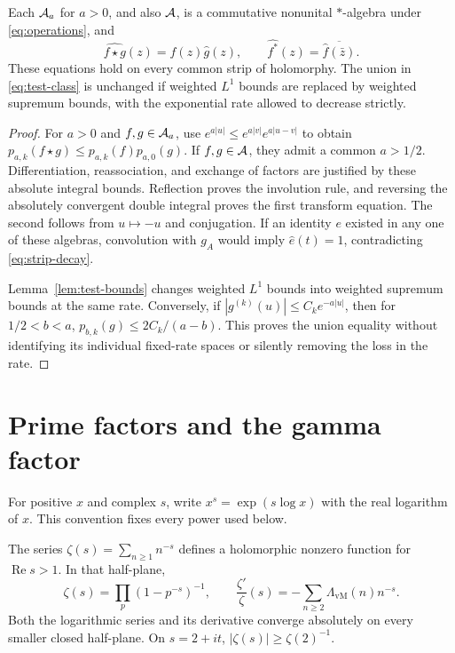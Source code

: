 \begin{proposition}
\label{prop:algebra}
Each $\mathcal A_a$ for $a>0$, and also $\mathcal A$, is a commutative nonunital
$*$-algebra under \eqref{eq:operations}, and
\begin{equation}
 \widehat{f\star g}(z)=\widehat f(z)\widehat g(z),\qquad
 \widehat{f^*}(z)=\overline{\widehat f(\bar z)}.
 \label{eq:star-transform}
\end{equation}
These equations hold on every common strip of holomorphy.
The union in \eqref{eq:test-class} is unchanged if weighted $L^1$ bounds
are replaced by weighted supremum bounds, with the exponential rate allowed
to decrease strictly.
\end{proposition}

\begin{proof}
For $a>0$ and $f,g\in\mathcal A_a$, use
$e^{a|u|}\leq e^{a|v|}e^{a|u-v|}$ to obtain
$p_{a,k}(f\star g)\leq p_{a,k}(f)p_{a,0}(g)$.
If $f,g\in\mathcal A$, they admit a common $a>1/2$.
Differentiation, reassociation, and exchange of factors are justified by
these absolute integral bounds.  Reflection proves the involution rule,
and reversing the absolutely convergent double integral proves the first
transform equation.  The second follows from $u\mapsto-u$ and conjugation.
If an identity $e$ existed in any one of these algebras, convolution with
$g_A$ would imply $\widehat e(t)=1$, contradicting \eqref{eq:strip-decay}.

Lemma~\ref{lem:test-bounds} changes weighted $L^1$ bounds into weighted
supremum bounds at the same rate.  Conversely, if
$|g^{(k)}(u)|\leq C_k e^{-a|u|}$, then for $1/2<b<a$,
$p_{b,k}(g)\leq2C_k/(a-b)$.
This proves the union equality without identifying its individual fixed-rate
spaces or silently removing the loss in the rate.
\end{proof}

\section{Prime factors and the gamma factor}
\label{sec:euler-gamma}

For positive $x$ and complex $s$, write $x^s=\exp(s\log x)$ with the real
logarithm of $x$.  This convention fixes every power used below.

\begin{lemma}
\label{lem:euler}
The series $\zeta(s)=\sum_{n\geq1}n^{-s}$ defines a holomorphic nonzero
function for $\operatorname{Re}s>1$.  In that half-plane,
\begin{equation}
 \zeta(s)=\prod_p(1-p^{-s})^{-1},\qquad
 \frac{\zeta'}{\zeta}(s)=-\sum_{n\geq2}\Lambda_{\mathrm{vM}}(n)n^{-s}.
 \label{eq:euler}
\end{equation}
Both the logarithmic series and its derivative converge absolutely on every
smaller closed half-plane.  On $s=2+it$, $|\zeta(s)|\geq\zeta(2)^{-1}$.
\end{lemma}

